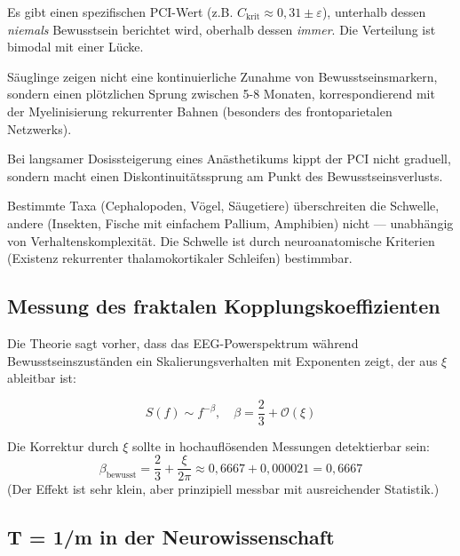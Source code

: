 \documentclass[11pt,a4paper]{article}
\begin{document}
	\begin{predbox}
		Es gibt einen spezifischen PCI-Wert (z.B. \(C_{\text{krit}} \approx 0,31 \pm \varepsilon\)), unterhalb dessen \emph{niemals} Bewusstsein berichtet wird, oberhalb dessen \emph{immer}. Die Verteilung ist bimodal mit einer Lücke.
	\end{predbox}
	
	\begin{predbox}
		Säuglinge zeigen nicht eine kontinuierliche Zunahme von Bewusstseinsmarkern, sondern einen plötzlichen Sprung zwischen 5-8 Monaten, korrespondierend mit der Myelinisierung rekurrenter Bahnen (besonders des frontoparietalen Netzwerks).
	\end{predbox}
	
	\begin{predbox}
		Bei langsamer Dosissteigerung eines Anästhetikums kippt der PCI nicht graduell, sondern macht einen Diskontinuitätssprung am Punkt des Bewusstseinsverlusts.
	\end{predbox}
	
	\begin{predbox}
		Bestimmte Taxa (Cephalopoden, Vögel, Säugetiere) überschreiten die Schwelle, andere (Insekten, Fische mit einfachem Pallium, Amphibien) nicht — unabhängig von Verhaltenskomplexität. Die Schwelle ist durch neuroanatomische Kriterien (Existenz rekurrenter thalamokortikaler Schleifen) bestimmbar.
	\end{predbox}
	
	\subsection{Messung des fraktalen Kopplungskoeffizienten}
	
	Die Theorie sagt vorher, dass das EEG-Powerspektrum während Bewusstseinszuständen ein Skalierungsverhalten mit Exponenten zeigt, der aus \(\xi\) ableitbar ist:
	
	\[
	S(f) \sim f^{-\beta}, \quad \beta = \frac{2}{3} + \mathcal{O}(\xi)
	\]
	
	Die Korrektur durch \(\xi\) sollte in hochauflösenden Messungen detektierbar sein:
	\[
	\beta_{\text{bewusst}} = \frac{2}{3} + \frac{\xi}{2\pi} \approx 0,6667 + 0,000021 = 0,6667
	\]
	(Der Effekt ist sehr klein, aber prinzipiell messbar mit ausreichender Statistik.)
	
	\subsection{T = 1/m in der Neurowissenschaft}
	
\end{document}
